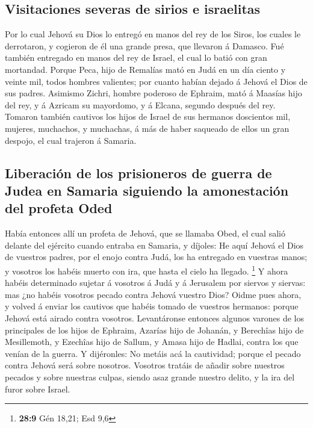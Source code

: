 \hypertarget{visitaciones-severas-de-sirios-e-israelitas}{%
\subsection{Visitaciones severas de sirios e
israelitas}\label{visitaciones-severas-de-sirios-e-israelitas}}

 Por lo cual Jehová su Dios lo entregó en manos del rey de
los Siros, los cuales le derrotaron, y cogieron de él una grande presa,
que llevaron á Damasco. Fué también entregado en manos del rey de
Israel, el cual lo batió con gran mortandad.  Porque Peca,
hijo de Remalías mató en Judá en un día ciento y veinte mil, todos
hombres valientes; por cuanto habían dejado á Jehová el Dios de sus
padres.  Asimismo Zichri, hombre poderoso de Ephraim, mató á
Maasías hijo del rey, y á Azricam su mayordomo, y á Elcana, segundo
después del rey.  Tomaron también cautivos los hijos de
Israel de sus hermanos doscientos mil, mujeres, muchachos, y muchachas,
á más de haber saqueado de ellos un gran despojo, el cual trajeron á
Samaria.

\hypertarget{liberaciuxf3n-de-los-prisioneros-de-guerra-de-judea-en-samaria-siguiendo-la-amonestaciuxf3n-del-profeta-oded}{%
\subsection{Liberación de los prisioneros de guerra de Judea en Samaria
siguiendo la amonestación del profeta
Oded}\label{liberaciuxf3n-de-los-prisioneros-de-guerra-de-judea-en-samaria-siguiendo-la-amonestaciuxf3n-del-profeta-oded}}

 Había entonces allí un profeta de Jehová, que se llamaba
Obed, el cual salió delante del ejército cuando entraba en Samaria, y
díjoles: He aquí Jehová el Dios de vuestros padres, por el enojo contra
Judá, los ha entregado en vuestras manos; y vosotros los habéis muerto
con ira, que hasta el cielo ha llegado. \footnote{\textbf{28:9} Gén
  18,21; Esd 9,6}  Y ahora habéis determinado sujetar á
vosotros á Judá y á Jerusalem por siervos y siervas: mas ¿no habéis
vosotros pecado contra Jehová vuestro Dios?  Oidme pues
ahora, y volved á enviar los cautivos que habéis tomado de vuestros
hermanos: porque Jehová está airado contra vosotros. 
Levantáronse entonces algunos varones de los principales de los hijos de
Ephraim, Azarías hijo de Johanán, y Berechîas hijo de Mesillemoth, y
Ezechîas hijo de Sallum, y Amasa hijo de Hadlai, contra los que venían
de la guerra.  Y dijéronles: No metáis acá la cautividad;
porque el pecado contra Jehová será sobre nosotros. Vosotros tratáis de
añadir sobre nuestros pecados y sobre nuestras culpas, siendo asaz
grande nuestro delito, y la ira del furor sobre Israel.

